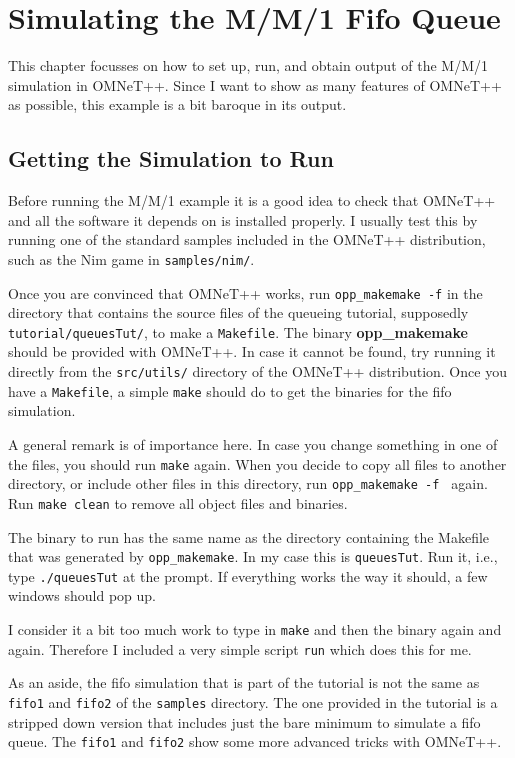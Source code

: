 \documentclass[a4paper]{article}
\begin{document}
\section{Simulating the M/M/1 Fifo Queue}
\label{sec:simulating-mm1-fifo}


This chapter focusses on how to set up, run, and obtain output of the
M/M/1 simulation in OMNeT++. Since I want to show as many features of
OMNeT++ as possible,  this example is a bit baroque in its output.


\subsection{Getting the Simulation to Run}
\label{sec:getting-it-running}
Before running the M/M/1 example it is a good idea to check that
OMNeT++ and all the software it depends on is installed properly. I
usually test this by running one of the standard samples included in
the OMNeT++ distribution, such as the Nim game in
\texttt{samples/nim/}.

Once you are convinced that OMNeT++ works, run \texttt{opp\_makemake
  -f} in the directory that contains the source files of the queueing
tutorial, supposedly \texttt{tutorial/queuesTut/}, to make a
\texttt{Makefile}. The binary \textbf{opp\_makemake} should be
provided with OMNeT++.  In case it cannot be found, try running it
directly from the \texttt{src/utils/} directory of the OMNeT++
distribution. Once you have a \texttt{Makefile}, a simple
\texttt{make} should do to get the binaries for the fifo simulation.

A general remark is of importance here. In case you change something
in one of the files, you should run \texttt{make} again. When you
decide to copy all files to another directory, or include other files
in this directory, run \texttt{opp\_makemake -f } again. Run
\texttt{make clean} to remove all object files and binaries.

The binary to run has the same name as the directory containing the
Makefile that was generated by \texttt{opp\_makemake}. In my case this
is \texttt{queuesTut}. Run it, i.e., type \texttt{./queuesTut} at the
prompt. If everything works the way it should, a few windows should
pop up.

I consider it a bit too much work to type in \texttt{make} and then
the binary  again and again. Therefore I included a very
simple script \texttt{run} which does this for me.

As an aside, the fifo simulation that is part of the tutorial is not
the same as  \texttt{fifo1} and \texttt{fifo2} of the \texttt{samples}
directory. The one provided in the tutorial is a stripped down version
that includes just the bare minimum to simulate a fifo queue. The
\texttt{fifo1} and \texttt{fifo2} show some more advanced tricks with OMNeT++.
\end{document}

